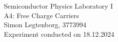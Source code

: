 \begin{centering}
	\huge Semiconductor Physics Laboratory \RN{1}\\
	\LARGE A4: Free Charge Carriers\\
	\vspace{0.35cm}
	\normalsize Simon Legtenborg, 3773994 \\ 
	\normalsize Experiment conducted on 18.12.2024 \\
	\vspace{1cm}
\end{centering}

